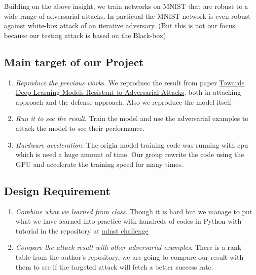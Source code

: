 \documentclass[
	letterpaper, %
	10pt, %
]{CSUniSchoolLabReport}
\begin{document}
Building on the above insight, we train networks on MNIST that are robust to a wide range of adversarial attacks. In particual the MNIST network is even robust against white-box attack of an iterative adversary. (But this is not our focus because our testing attack is based on the Black-box)
\subsection{Main target of our Project}
\begin{enumerate}
	\item \textit{Reproduce the previous works}. We reproduec the result from paper \href{https://arxiv.org/pdf/1706.06083.pdf}{Towards Deep Learning Models Resistant to Adversarial	Attacks}. both in attacking approach and the defense approach.  Also we reproduce the model itself 
	\item \textit{Run it to see the result}. Train the model and use the adversarial examples to attack the model to see their performance.
	\item \textit{Hardware acceleration}. The origin model training code was running with cpu which is need a huge amount of time. Our group rewrite the code using the GPU and accelerate the training speed for many times.
\end{enumerate}

\subsection{Design Requirement}
\begin{enumerate}
	\item \textit{Combine what we learned from class}. Though it is hard but we manage to put what we have learned into practice with hundreds of codes in Python with tutorial in the repository at \href{https://github.com/MadryLab/mnist_challenge}{minst challenge}
	\item \textit{Compare the attack result with other adversarial examples}. There is a rank table from the author's repository, we are going to compare our result with them to see if the targeted attack will fetch a better success rate.
\end{enumerate}
\end{document}
